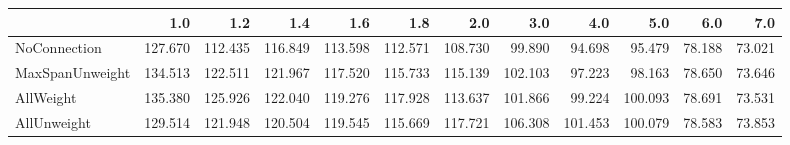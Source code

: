 \begin{tabular}{lrrrrrrrrrrr}
\toprule
{} &     1.0 &     1.2 &     1.4 &     1.6 &     1.8 &     2.0 &     3.0 &     4.0 &     5.0 &    6.0 &    7.0 \\
\midrule
NoConnection    & 127.670 & 112.435 & 116.849 & 113.598 & 112.571 & 108.730 &  99.890 &  94.698 &  95.479 & 78.188 & 73.021 \\
MaxSpanUnweight & 134.513 & 122.511 & 121.967 & 117.520 & 115.733 & 115.139 & 102.103 &  97.223 &  98.163 & 78.650 & 73.646 \\
AllWeight       & 135.380 & 125.926 & 122.040 & 119.276 & 117.928 & 113.637 & 101.866 &  99.224 & 100.093 & 78.691 & 73.531 \\
AllUnweight     & 129.514 & 121.948 & 120.504 & 119.545 & 115.669 & 117.721 & 106.308 & 101.453 & 100.079 & 78.583 & 73.853 \\
\bottomrule
\end{tabular}

